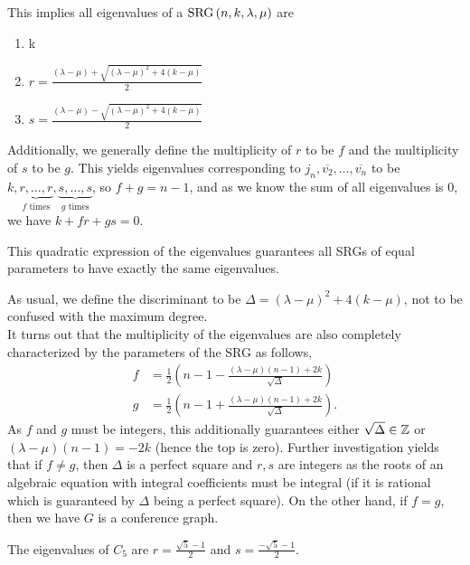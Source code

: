 This implies all eigenvalues of a \(\operatorname{SRG} \left( n, k, \lambda, \mu \right) \) are
\begin{enumerate}
	\item k
	\item \(r = \frac{\left( \lambda - \mu \right) + \sqrt{\left( \lambda - \mu \right) ^2 + 4\left( k - \mu \right) } }{2}\)
	\item \(s = \frac{\left( \lambda - \mu \right) - \sqrt{\left( \lambda - \mu \right) ^2 + 4\left( k - \mu \right) } }{2}\)
\end{enumerate}
Additionally, we generally define the multiplicity of \(r\) to be \(f\) and the multiplicity of \(s\) to be \(g\). This yields eigenvalues corresponding to \(j_{n}, \overline{v_2}, \ldots, \overline{v_{n}}\) to be \(k, \underbrace{r, \ldots, r}_{f \text{ times}}, \underbrace{s, \ldots, s}_{g \text{ times}}\), so \(f + g = n-1\), and as we know the sum of all eigenvalues is \(0\), we have \(k + fr + gs = 0\).
\begin{remark}
	This quadratic expression of the eigenvalues guarantees all SRGs of equal parameters to have exactly the same eigenvalues.
\end{remark}
As usual, we define the discriminant to be \(\Delta = \left( \lambda - \mu \right) ^2 + 4\left( k- \mu \right) \), not to be confused with the maximum degree.\\
It turns out that the multiplicity of the eigenvalues are also completely characterized by the parameters of the SRG as follows,
\begin{align*}
	f &= \frac{1}{2}\left( n - 1 - \frac{\left( \lambda - \mu \right) \left( n - 1 \right) +2k}{\sqrt{\Delta} } \right) \\
	g &= \frac{1}{2}\left( n - 1 + \frac{\left( \lambda - \mu \right) \left( n - 1 \right) +2k}{\sqrt{\Delta} } \right)
.\end{align*}
As \(f\) and \(g\) must be integers, this additionally guarantees either \(\sqrt{\Delta} \in \mathbb{Z}\) or \(\left( \lambda - \mu \right) \left( n-1 \right) = -2k\) (hence the top is zero). Further investigation yields that if \(f\neq g\), then \(\Delta\) is a perfect square and \(r, s\) are integers as the roots of an algebraic equation with integral coefficients must be integral (if it is rational which is guaranteed by \(\Delta\) being a perfect square). On the other hand, if \(f = g\), then we have \(G\) is a conference graph.
\begin{example}
	The eigenvalues of \(C_5\) are \(r = \frac{\sqrt{5} -1}{2}\) and \(s = \frac{-\sqrt{5} -1}{2}\).
\end{example}
